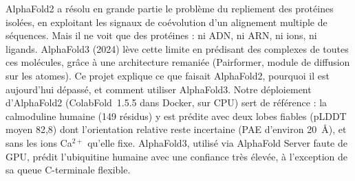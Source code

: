 AlphaFold2 a résolu en grande partie le problème du repliement des protéines isolées, en exploitant les signaux de coévolution d'un alignement multiple de séquences. Mais il ne voit que des protéines : ni ADN, ni ARN, ni ions, ni ligands. AlphaFold3 (2024) lève cette limite en prédisant des complexes de toutes ces molécules, grâce à une architecture remaniée (Pairformer, module de diffusion sur les atomes). Ce projet explique ce que faisait AlphaFold2, pourquoi il est aujourd'hui dépassé, et comment utiliser AlphaFold3. Notre déploiement d'AlphaFold2 (ColabFold~1.5.5 dans Docker, sur CPU) sert de référence : la calmoduline humaine (149 résidus) y est prédite avec deux lobes fiables (pLDDT moyen 82,8) dont l'orientation relative reste incertaine (PAE d'environ 20~Å), et sans les ions Ca$^{2+}$ qu'elle fixe. AlphaFold3, utilisé via AlphaFold Server faute de GPU, prédit l'ubiquitine humaine avec une confiance très élevée, à l'exception de sa queue C-terminale flexible.